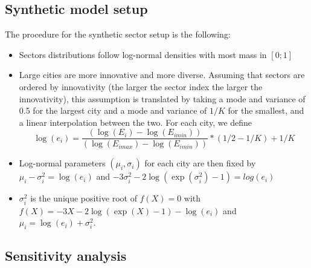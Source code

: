 







\subsection*{Synthetic model setup}

The procedure for the synthetic sector setup is the following:
\begin{itemize}
    \item Sectors distributions follow log-normal densities with most mass in $\left[0;1\right]$
    \item Large cities are more innovative and more diverse. Assuming that sectors are ordered by innovativity (the larger the sector index the larger the innovativity), this assumption is translated by taking a mode and variance of 0.5 for the largest city and a mode and variance of $1/K$ for the smallest, and a linear interpolation between the two. For each city, we define
    \[
    \log(e_i) = \frac{(\log(E_i) - \log(E_{imin}))}{(\log(E_{imax}) - \log(E_{imin}))} * (1/2 - 1/K) + 1/K
    \]
    \item Log-normal parameters $(\mu_i,\sigma_i)$ for each city are then fixed by $\mu_i - \sigma_i^2 = \log(e_i)$ and $-3 \sigma_i^2 - 2 \log(\exp(\sigma_i^2) - 1) = log(e_i)$
    \item $\sigma_i^2$ is the unique positive root of $f(X)=0$ with $f(X) = -3X - 2 \log(\exp(X) - 1) - \log(e_i)$ and $\mu_i = \log(e_i) + \sigma_i^2$.
\end{itemize}






\subsection*{Sensitivity analysis}

